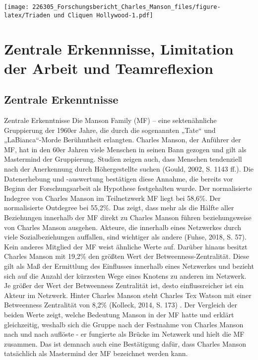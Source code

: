 \documentclass[
]{article}
\begin{document}
\texttt{[image: 226305\_Forschungsbericht\_Charles\_Manson\_files/figure-latex/Triaden und Cliquen Hollywood-1.pdf]}

\hypertarget{zentrale-erkennnisse-limitation-der-arbeit-und-teamreflexion}{%
\section{Zentrale Erkennnisse, Limitation der Arbeit und
Teamreflexion}\label{zentrale-erkennnisse-limitation-der-arbeit-und-teamreflexion}}

\hypertarget{zentrale-erkenntnisse}{%
\subsection{Zentrale Erkenntnisse}\label{zentrale-erkenntnisse}}

Zentrale Erkenntnisse Die Manson Family (MF) -- eine sektenähnliche
Gruppierung der 1960er Jahre, die durch die sogenannten „Tate`` und
„LaBianca``-Morde Berühmtheit erlangten. Charles Manson, der Anführer
der MF, hat in den 60er Jahren viele Menschen in seinen Bann gezogen und
gilt als Mastermind der Gruppierung. Studien zeigen auch, dass Menschen
tendenziell nach der Anerkennung durch Höhergestellte suchen (Gould,
2002, S. 1143 ff.). Die Datenerhebung und -auswertung bestätigen diese
Annahme, die bereits vor Beginn der Forschungsarbeit als Hypothese
festgehalten wurde. Der normalisierte Indegree von Charles Manson im
Teilnetzwerk MF liegt bei 58,6\%. Der normalisierte Outdegree bei
55,2\%. Das zeigt, dass mehr als die Hälfte aller Beziehungen innerhalb
der MF direkt zu Charles Manson führen beziehungsweise von Charles
Manson ausgehen. Akteure, die innerhalb eines Netzwerkes durch viele
Sozialbeziehungen auffallen, sind wichtiger als andere (Fuhse, 2018, S.
57). Kein anderes Mitglied der MF weist ähnliche Werte auf. Darüber
hinaus besitzt Charles Manson mit 19,2\% den größten Wert der
Betweenness-Zentralität. Diese gilt als Maß der Ermittlung des
Einflusses innerhalb eines Netzwerkes und bezieht sich auf die Anzahl
der kürzesten Wege eines Knotens zu anderen im Netzwerk. Je größer der
Wert der Betweenness Zentralität ist, desto einflussreicher ist ein
Akteur im Netzwerk. Hinter Charles Manson steht Charles Tex Watson mit
einer Betweenness Zentralität von 8,2\% (Kolleck, 2014, S. 173) . Der
Vergleich der beiden Werte zeigt, welche Bedeutung Manson in der MF
hatte und erklärt gleichzeitig, weshalb sich die Gruppe nach der
Festnahme von Charles Manson nach und nach auflöste - er fungierte als
Brücke im Netzwerk und hielt die MF zusammen. Das ist demnach auch eine
Bestätigung dafür, dass Charles Manson tatsächlich als Mastermind der MF
bezeichnet werden kann.
\end{document}
